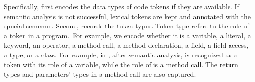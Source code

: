 %
Specifically, {\tool} first encodes the data types of code tokens if
they are available. If semantic analysis is not successful, lexical
tokens are kept and annotated with the special sememe .
%
Second, {\tool} records the token types. Token
type refers to the role of a token in a program.~For example, we 
encode whether it is a variable, a literal, a keyword, an operator, a
method call, a method declaration, a field, a field access, a type, or
a class.
For example, in , after semantic analysis,
 is recognized as a token with its role of a variable, while
the role of  is a method call.
%
The return types and parameters' types in a method call are also
captured. 




